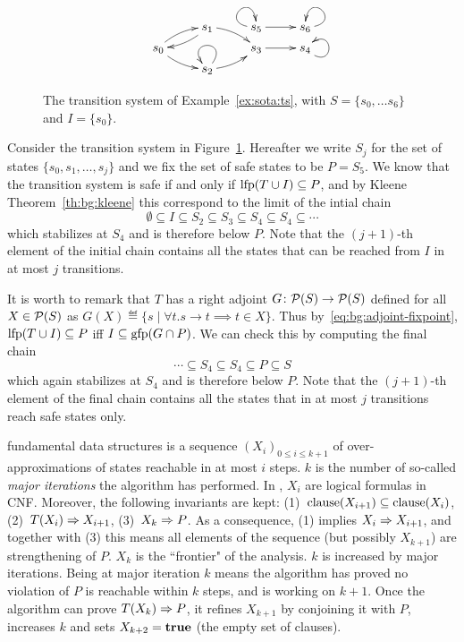 \begin{example}\label{ex:sota:ts}
	\begin{figure}[t]
		\begin{displaymath}
			\xymatrix@R=5pt{
			& s_1 \ar@/^1ex/[rd] \ar@/^1ex/[ld] &  s_5 \ar@(l,u)\ar[r] & s_6 \ar@(r,u)\\
			s_0 \ar@/^1ex/[ur] \ar@/_1ex/[rd] & &s_3 \ar[r]& s_4\ar@(rd,ur) \\
			& s_2 \ar@(ur,ul) \ar@/_1ex/[ru] &
			}
		\end{displaymath}
		\caption{The transition system of Example~\ref{ex:sota:ts}, with $S = \{ s_0, \dots s_6 \}$ and $I=\{s_0\}$.}\label{fig:sota:ts}
	\end{figure}

	Consider the transition system in Figure~\ref{fig:sota:ts}. Hereafter we write $S_{j}$ for the set of states $\{s_0, s_1, \dots, s_j\}$ and we fix the set of safe states to be $P = S_5$.
	We know that the transition system is safe if and only if $\text{lfp}(T \cup I) \subseteq P$, and by Kleene Theorem~\ref{th:bg:kleene} this correspond to the limit of the intial chain
	\[
	\emptyset \subseteq  I \subseteq S_2 \subseteq S_3 \subseteq S_4 \subseteq S_4 \subseteq \cdots
	\]
	which stabilizes at $S_4$ and is therefore below $P$. Note that the $(j+1)$-th element of the initial chain contains all the states that can be reached from $I$ in at most $j$ transitions.

	It is worth to remark that $T$ has a right adjoint $G \colon \mathcal{P}(S) \to \mathcal{P}(S)$ defined for all $X \in \mathcal{P}(S)$ as $G(X) \eqdef \{s \mid \forall t. s \rightarrow t \implies t \in X \}$. Thus by~\eqref{eq:bg:adjoint-fixpoint}, $\text{lfp} (T \cup I) \subseteq P$ iff $I \subseteq \text{gfp} (G \cap P)$. We can check this by computing the final chain
	\[
	\cdots \subseteq S_4 \subseteq S_4 \subseteq P \subseteq S
	\]
	which again stabilizes at $S_4$ and is therefore below $P$. Note that the $(j+1)$-th element of the final chain contains all the states that in at most $j$ transitions reach safe states only.
\end{example}

 fundamental data structures is a sequence $(X_i)_{0 \le i \le k + 1}$ of over-approximations of states reachable in at most $i$ steps. $k$ is the number of so-called \emph{major iterations} the algorithm has performed.
In , $X_i$ are logical formulas in CNF. Moreover, the following invariants are kept: (1)~$\text{clause}(X_{i+1}) \subseteq \text{clause}(X_i)$, (2)~$T(X_i) \Rightarrow X_{i+1}$, (3)~$X_{k} \Rightarrow P$.
As a consequence, (1) implies $X_i \Rightarrow X_{i+1}$, and together with (3) this means all elements of the sequence (but possibly $X_{k+1}$) are strengthening of $P$. $X_k$ is the ``frontier" of the analysis. $k$ is increased by major iterations. Being at major iteration $k$ means the algorithm has proved no violation of $P$ is reachable within $k$ steps, and is working on $k + 1$. Once the algorithm can prove $T(X_k) \Rightarrow P$, it refines $X_{k+1}$ by conjoining it with $P$, increases $k$ and sets $X_{k+2} = \textbf{true}$ (the empty set of clauses).

